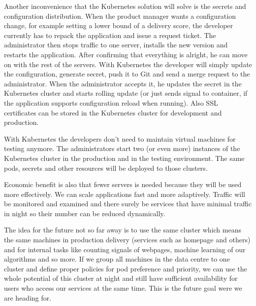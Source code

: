 Another inconvenience that the Kubernetes solution will solve is the secrets and configuration distribution. When the product manager wants a configuration change, for example setting a lower bound of a delivery score, the developer currently has to repack the application and issue a request ticket. The administrator then stops traffic to one server, installs the new version and restarts the application. After confirming that everything is alright, he can move on with the rest of the servers. With Kubernetes the developer will simply update the configuration, generate secret, push it to Git and send a merge request to the administrator. When the administrator accepts it, he updates the secret in the Kubernetes cluster and starts rolling update (or just sends signal to container, if the application supports configuration reload when running). Also SSL certificates can be stored in the Kubernetes cluster for development and production.

With Kubernetes the developers don’t need to maintain virtual machines for testing anymore. The administrators start two (or even more) instances of the Kubernetes cluster in the production and in the testing environment. The same pods, secrets and other resources will be deployed to those clusters.

Economic benefit is also that fewer servers is needed because they will be used more effectively. We can scale applications fast and more adaptively. Traffic will be monitored and examined and there surely be services that have minimal traffic in night so their number can be reduced dynamically.

The idea for the future not so far away is to use the same cluster which means the same machines in production delivery (services such as homepage and others) and for internal tasks like counting signals of webpages, machine learning of our algorithms and so more. If we group all machines in the data centre to one cluster and define proper policies for pod preference and priority, we can use the whole potential of this cluster at night and still have sufficient availability for users who access our services at the same time. This is the future goal were we are heading for.

